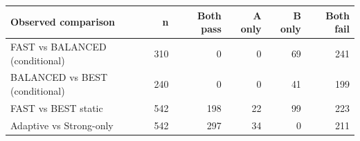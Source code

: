 \begin{tabular}{lrrrrr}
\toprule
Observed comparison & n & Both pass & A only & B only & Both fail \\
\midrule
FAST vs BALANCED (conditional) & 310 & 0 & 0 & 69 & 241 \\
BALANCED vs BEST (conditional) & 240 & 0 & 0 & 41 & 199 \\
FAST vs BEST static & 542 & 198 & 22 & 99 & 223 \\
Adaptive vs Strong-only & 542 & 297 & 34 & 0 & 211 \\
\bottomrule
\end{tabular}
